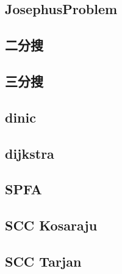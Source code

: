     \subsection{JosephusProblem}
        
    \subsection{二分搜}
    \subsection{三分搜}
    \subsection{dinic}
    \subsection{dijkstra}
    \subsection{SPFA}
        
    \subsection{SCC Kosaraju}
    \subsection{SCC Tarjan}
